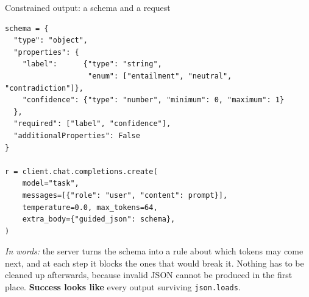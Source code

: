 \documentclass[aspectratio=169,10pt]{beamer}
\begin{document}
\iffalse
\begin{frame}[fragile,shrink=5]{Constrained output: a schema and a request}
\begin{lstlisting}
schema = {
  "type": "object",
  "properties": {
    "label":      {"type": "string",
                   "enum": ["entailment", "neutral", "contradiction"]},
    "confidence": {"type": "number", "minimum": 0, "maximum": 1}
  },
  "required": ["label", "confidence"],
  "additionalProperties": False
}

r = client.chat.completions.create(
    model="task",
    messages=[{"role": "user", "content": prompt}],
    temperature=0.0, max_tokens=64,
    extra_body={"guided_json": schema},
)
\end{lstlisting}
  \small
  \emph{In words:} the server turns the schema into a rule about which tokens
  may come next, and at each step it blocks the ones that would break it.
  Nothing has to be cleaned up afterwards, because invalid JSON cannot be
  produced in the first place.
  \textbf{Success looks like} every output surviving \texttt{json.loads}.
\end{frame}
\end{document}
